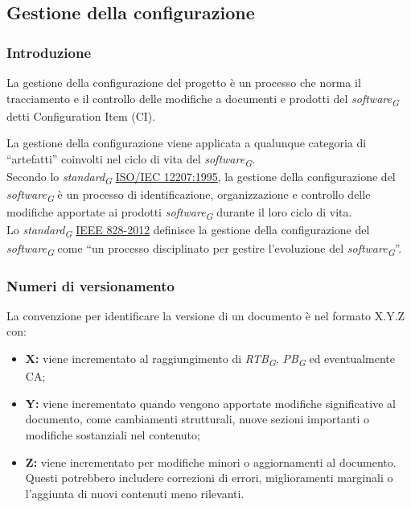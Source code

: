 \subsection{Gestione della configurazione}
\subsubsection{Introduzione}
La gestione della configurazione del progetto è un processo che norma il tracciamento e il controllo delle modifiche a documenti e prodotti del \textit{software}\textsubscript{\textit{G}} detti Configuration Item (CI).

La gestione della configurazione viene applicata a qualunque categoria di “artefatti” coinvolti nel ciclo di vita del \textit{software}\textsubscript{\textit{G}}. \\
Secondo lo \textit{standard}\textsubscript{\textit{G}} \href{https://www.math.unipd.it/~tullio/IS-1/2009/Approfondimenti/ISO_12207-1995.pdf}{ISO/IEC 12207:1995}, la gestione della configurazione del \textit{software}\textsubscript{\textit{G}} è un processo di identificazione, organizzazione e controllo delle modifiche apportate ai prodotti \textit{software}\textsubscript{\textit{G}} durante il loro ciclo di vita. \\
Lo \textit{standard}\textsubscript{\textit{G}} \href{https://standards.ieee.org/ieee/828/5367/}{IEEE 828-2012} definisce la gestione della configurazione del \textit{software}\textsubscript{\textit{G}} come “un processo disciplinato per gestire l’evoluzione del \textit{software}\textsubscript{\textit{G}}”.

\subsubsection{Numeri di versionamento}\label{subsubsec:versionamento}
La convenzione per identificare la versione di un documento è nel formato X.Y.Z con:
\begin{itemize}
    \item \textbf{X:} viene incrementato al raggiungimento di \textit{RTB}\textsubscript{\textit{G}}, \textit{PB}\textsubscript{\textit{G}} ed eventualmente CA;
    \item \textbf{Y:} viene incrementato quando vengono apportate modifiche significative al documento, come cambiamenti strutturali, nuove sezioni importanti o modifiche sostanziali nel contenuto;
    \item \textbf{Z:} viene incrementato per modifiche minori o aggiornamenti al documento. Questi potrebbero includere correzioni di errori, miglioramenti marginali o l'aggiunta di nuovi contenuti meno rilevanti.
\end{itemize}

